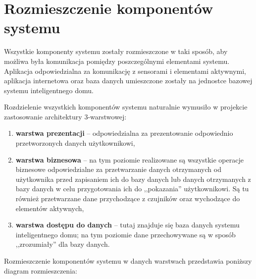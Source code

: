\documentclass[eng,oneside]{mgr}
\begin{document}
\section{Rozmieszczenie komponentów systemu}
Wszystkie komponenty systemu zostały rozmieszczone w taki sposób, aby możliwa była komunikacja pomiędzy poszczególnymi elementami systemu. Aplikacja odpowiedzialna za komunikację z sensorami i elementami aktywnymi, aplikacja internetowa oraz baza danych umieszczone zostały na jednostce bazowej systemu inteligentnego domu.

Rozdzielenie wszystkich komponentów systemu naturalnie wymusiło w projekcie zastosowanie architektury 3-warstwowej:
\begin{enumerate}
	\item \textbf{warstwa prezentacji} – odpowiedzialna za prezentowanie odpowiednio przetworzonych danych użytkownikowi,
	\item \textbf{warstwa biznesowa} – na tym poziomie realizowane są wszystkie operacje biznesowe odpowiedzialne za przetwarzanie danych otrzymanych od użytkownika przed zapisaniem ich do bazy danych lub danych otrzymanych z bazy danych w celu przygotowania ich do ,,pokazania'' użytkownikowi. Są tu również przetwarzane dane przychodzące z czujników oraz wychodzące do elementów aktywnych,
	\item \textbf{warstwa dostępu do danych} – tutaj znajduje się baza danych systemu inteligentnego domu; na tym poziomie dane przechowywane są w sposób ,,zrozumiały'' dla bazy danych.
\end{enumerate}
Rozmieszczenie komponentów systemu w danych warstwach przedstawia poniższy diagram rozmieszczenia:
\clearpage
\end{document}
